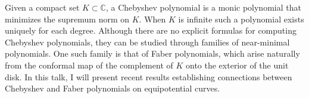 {%
    Given a compact set $K\subset \mathbb C$, a Chebyshev polynomial
    is a monic polynomial that minimizes the supremum norm on $K$.
    When $K$ is infinite such a polynomial exists uniquely for each
    degree. Although there are no explicit formulas for computing
    Chebyshev polynomials, they can be studied through families of
    near-minimal polynomials. One such family is that of Faber
    polynomials, which arise naturally from the conformal map of the
    complement of $K$ onto the exterior of the unit disk. In this
    talk, I will present recent results establishing connections
    between Chebyshev and Faber polynomials on equipotential curves.
}
